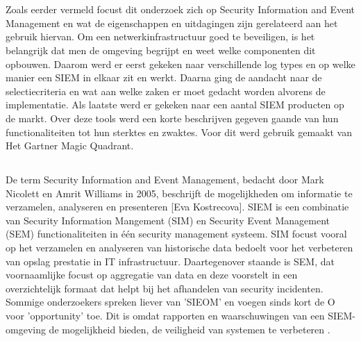 \chapter{}
\label{ch:stand-van-zaken}

Zoals eerder vermeld focust dit onderzoek zich op Security Information and Event Management en wat de eigenschappen en uitdagingen zijn gerelateerd aan het gebruik hiervan.
Om een netwerkinfrastructuur goed te beveiligen, is het belangrijk dat men de omgeving begrijpt en weet welke componenten dit opbouwen. Daarom werd er eerst gekeken naar verschillende log types en op welke manier een SIEM in elkaar zit en werkt.
Daarna ging de aandacht naar de selectiecriteria en wat aan welke zaken er moet gedacht worden alvorens de implementatie.
Als laatste werd er gekeken naar een aantal SIEM producten op de markt. Over deze tools werd een korte beschrijven gegeven gaande van hun functionaliteiten tot hun sterktes en zwaktes. Voor dit werd gebruik gemaakt van Het Gartner Magic Quadrant. 
\section{}

De term Security Information and Event Management, bedacht door Mark Nicolett en Amrit Williams in 2005, beschrijft de mogelijkheden om informatie te verzamelen, analyseren en presenteren [Eva Kostrecova]. SIEM is een combinatie van Security Information Mangement (SIM) en Security Event Management (SEM) functionaliteiten in één security management systeem. 
SIM focust vooral op het verzamelen en analyseren van historische data bedoelt voor het verbeteren van opslag prestatie in IT infrastructuur. Daartegenover staande is SEM, dat voornaamlijke focust op aggregatie van data en deze voorstelt in een overzichtelijk formaat dat helpt bij het afhandelen van security incidenten. \autocite{Morteza Zeinali} Sommige onderzoekers spreken liever van 'SIEOM' en voegen sinds kort de O voor 'opportunity' toe. Dit is omdat rapporten en waarschuwingen van een SIEM-omgeving de mogelijkheid bieden, de veiligheid van systemen te verbeteren \autocite{Dorigo2012}.

\section{}

